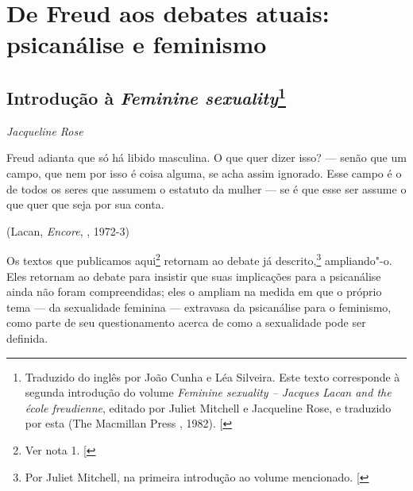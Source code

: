 \part{De Freud aos debates atuais:\\ psicanálise e feminismo}


\chapter*{Introdução à \emph{Feminine sexuality}\footnote{Traduzido
  do inglês por João Cunha e Léa Silveira. Este texto corresponde à
  segunda introdução do volume \emph{Feminine sexuality -- Jacques Lacan
  and the école freudienne}, editado por Juliet Mitchell e
  Jacqueline Rose, e traduzido por esta (The Macmillan Press , 1982).
  {[}\versal{N.~T.}{]}}}

\begin{flushright}
\emph{Jacqueline Rose}
\end{flushright}

\epigraph{Freud adianta que só há libido masculina. O que quer dizer isso? ---
senão que um campo, que nem por isso é coisa alguma, se acha assim
ignorado. Esse campo é o de todos os seres que assumem o estatuto da
mulher --- se é que esse ser assume o que quer que seja por sua conta.}{(Lacan, \emph{Encore}, , 1972-3)}

Os textos que publicamos aqui\footnote{Ver nota 1. {[}\versal{N.~T.}{]}} retornam
ao debate já descrito,\footnote{Por Juliet Mitchell, na primeira
  introdução ao volume mencionado. {[}\versal{N.~T.}{]}} ampliando"-o. Eles
retornam ao debate para insistir que suas implicações para a psicanálise
ainda não foram compreendidas; eles o ampliam na medida em que o próprio
tema --- da sexualidade feminina --- extravasa da psicanálise para o
feminismo, como parte de seu questionamento acerca de como a sexualidade
pode ser definida.

